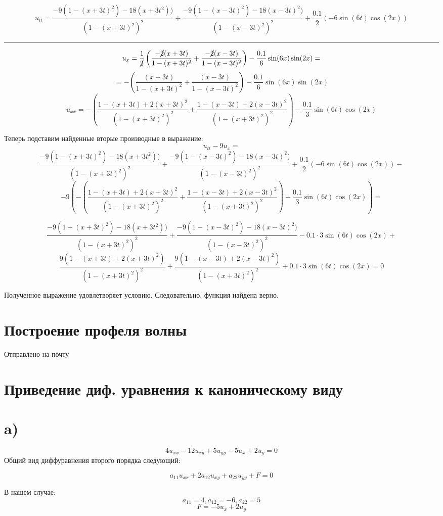 \documentclass[a4paper,12pt]{article}
\begin{document}
	\[
		u_{tt} = \frac{-9(1-(x+3t)^2) - 18(x+3t^2))}{(1-(x+3t)^2)^2} + \frac{-9(1-(x-3t)^2) -18(x-3t)^2)}{(1-(x-3t)^2)^2} + \frac{0.1}{2}(-6\sin(6t)\cos(2x))
	\]
	
\begin{center}
	\rule{0.8\linewidth}{1pt}
\end{center}
	\[
		u_x = \frac{1}{\cancel{2}}\left(\frac{-\cancel{2}(x+3t)}{1-(x+3t)^2} + \frac{-\cancel{2}(x-3t)}{1-(x-3t)^2}\right) - \frac{0.1}{6}\sin(6x)\sin(2x) =
	\]
	\[
		= -\left(\frac{(x+3t)}{1-(x+3t)^2} + \frac{(x-3t)}{1-(x-3t)^2}\right) - \frac{0.1}{6}\sin(6x)\sin(2x) 
	\]
	\[
		u_{xx} = -\left(\frac{1-(x+3t) + 2(x+3t)^2}{(1-(x+3t)^2)^2} + \frac{1-(x-3t) + 2(x-3t)^2}{(1-(x+3t)^2)^2}\right) - \frac{0.1}{3}\sin(6t)\cos(2x)
	\]
	
	Теперь подставим найденные вторые производные в выражение:
	\[
		u_{tt} - 9u_{x} = 
	\]
	\[
	 \frac{-9(1-(x+3t)^2) - 18(x+3t^2))}{(1-(x+3t)^2)^2} + \frac{-9(1-(x-3t)^2) -18(x-3t)^2)}{(1-(x-3t)^2)^2} + \frac{0.1}{2}(-6\sin(6t)\cos(2x)) - 
	\]
	\[
		-9\left( -\left(\frac{1-(x+3t) + 2(x+3t)^2}{(1-(x+3t)^2)^2} + \frac{1-(x-3t) + 2(x-3t)^2}{(1-(x+3t)^2)^2}\right) - \frac{0.1}{3}\sin(6t)\cos(2x)\right) = 
	\]

	\[
	\frac{-9(1-(x+3t)^2) - 18(x+3t^2))}{(1-(x+3t)^2)^2} + \frac{-9(1-(x-3t)^2) -18(x-3t)^2)}{(1-(x-3t)^2)^2} - {0.1}\cdot3\sin(6t)\cos(2x) +
	\]
	\[
	\frac{9(1-(x+3t) + 2(x+3t)^2)}{(1-(x+3t)^2)^2} + \frac{9(1-(x-3t) + 2(x-3t)^2)}{(1-(x+3t)^2)^2} + 0.1\cdot3\sin(6t)\cos(2x) = 0
	\]
	
	Полученное выражение удовлетворяет условию. Следовательно, функция найдена верно.
	\section{Построение профеля волны}
	Отправлено на почту
	\newpage
	\section{Приведение диф. уравнения к каноническому виду}
	\section*{a)}
	\[
		4u_{xx} - 12u_{xy} + 5u_{yy} - 5u_x + 2u_y = 0
	\]
	Общий вид диффуравнения второго порядка следующий:
		\begin{mdframed}
		\[
		 a_{11} u_{xx} + 2a_{12}u_{xy} + a_{22}u_{yy} + F = 0
		\]
	\end{mdframed}
	В нашем случае:
	\[
		a_{11} = 4, a_{12} = -6, a_{22} = 5
	\]
	\[
		F = - 5u_x + 2u_y 
	\]
	
\end{document}
